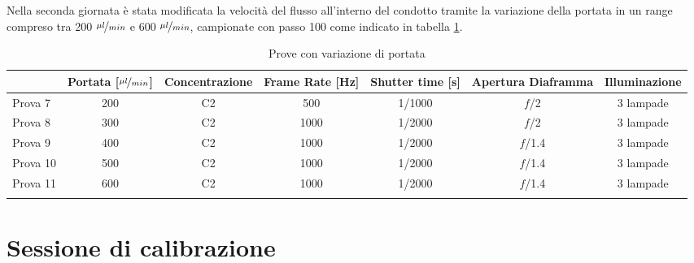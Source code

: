 \documentclass{article} %
\begin{document}
Nella seconda giornata è stata modificata la velocità del flusso all'interno del condotto tramite la variazione della portata in un range compreso tra 200 $\nicefrac{\mu l}{min}$ e 600 $\nicefrac{\mu l}{min}$, campionate con passo 100 come indicato in tabella \ref{tab:prove}.
\begin{longtable}{|l|c|c|c|c|c|c|}
	\hline
	\multicolumn{1}{|c|}{}
    & \multicolumn{1}{|c|}{Portata [$\nicefrac{\mu l}{min}$]}
	& \multicolumn{1}{|c|}{Concentrazione}
	& \multicolumn{1}{|c|}{Frame Rate [Hz]}
	& \multicolumn{1}{|c|}{Shutter time [s]}
	& \multicolumn{1}{|c|}{Apertura Diaframma}
	& \multicolumn{1}{|c|}{Illuminazione}
	\\
	\hline
	Prova 7      & 200 & C2 & 500  & 1/1000 & $f$/2   & 3 lampade \\
	\hline
	Prova 8      & 300 & C2 & 1000 & 1/2000 & $f$/2   & 3 lampade \\
	\hline
	Prova 9      & 400 & C2 & 1000 & 1/2000 & $f$/1.4 & 3 lampade \\
	\hline
	Prova 10     & 500 & C2 & 1000 & 1/2000 & $f$/1.4 & 3 lampade \\
	\hline
	Prova 11     & 600 & C2 & 1000 & 1/2000 & $f$/1.4 & 3 lampade \\
	\hline
	\caption{Prove con variazione di portata}
	\label{tab:prove}
\end{longtable}
\clearpage
\section{Sessione di calibrazione}
\end{document}
